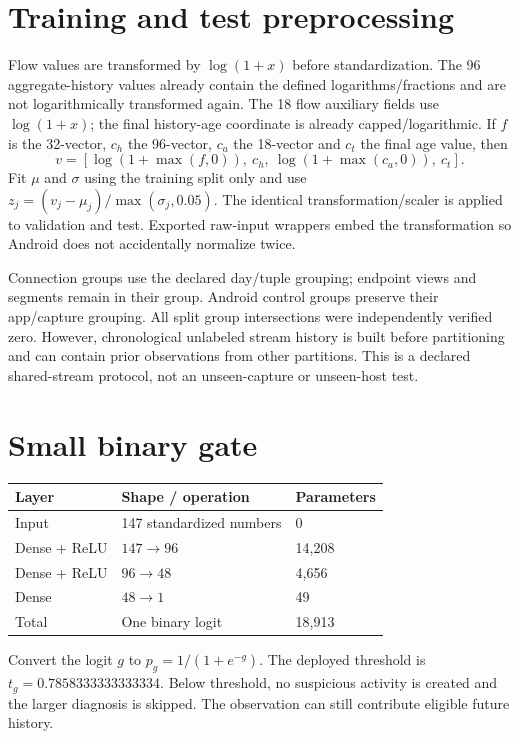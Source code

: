 \documentclass[11pt,a4paper,oneside]{report}
\begin{document}
\section{Training and test preprocessing}
Flow values are transformed by $\log(1+x)$ before standardization. The 96 aggregate-history values already contain the defined logarithms/fractions and are not logarithmically transformed again. The 18 flow auxiliary fields use $\log(1+x)$; the final history-age coordinate is already capped/logarithmic. If $f$ is the 32-vector, $c_h$ the 96-vector, $c_a$ the 18-vector and $c_t$ the final age value, then
\[v=[\log(1+\max(f,0)),\ c_h,\ \log(1+\max(c_a,0)),\ c_t].\]
Fit $\mu$ and $\sigma$ using the training split only and use $z_j=(v_j-\mu_j)/\max(\sigma_j,0.05)$. The identical transformation/scaler is applied to validation and test. Exported raw-input wrappers embed the transformation so Android does not accidentally normalize twice.

Connection groups use the declared day/tuple grouping; endpoint views and segments remain in their group. Android control groups preserve their app/capture grouping. All split group intersections were independently verified zero. However, chronological unlabeled stream history is built before partitioning and can contain prior observations from other partitions. This is a declared shared-stream protocol, not an unseen-capture or unseen-host test.

\section{Small binary gate}
\begin{center}
\begin{tabular}{lll}\toprule Layer & Shape / operation & Parameters\\\midrule
Input & 147 standardized numbers & 0\\
Dense + ReLU & $147\to96$ & 14,208\\
Dense + ReLU & $96\to48$ & 4,656\\
Dense & $48\to1$ & 49\\\midrule
Total & One binary logit & 18,913\\\bottomrule\end{tabular}
\end{center}
Convert the logit $g$ to $p_g=1/(1+e^{-g})$. The deployed threshold is $t_g=0.7858333333333334$. Below threshold, no suspicious activity is created and the larger diagnosis is skipped. The observation can still contribute eligible future history.
\end{document}

